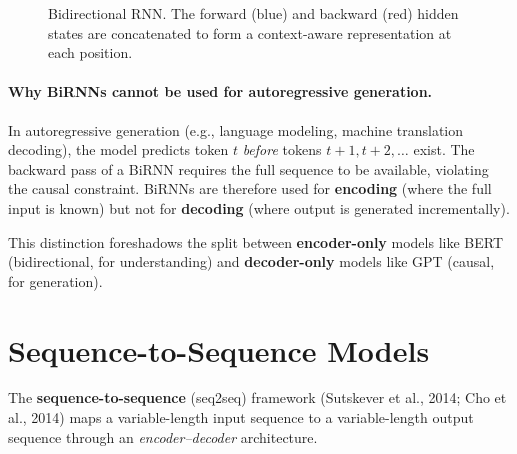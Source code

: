\begin{figure}[H]
\caption{Bidirectional RNN.  The forward (blue) and backward (red) hidden
states are concatenated to form a context-aware representation at each
position.}
\label{fig:birnn}
\end{figure}

\paragraph{Why BiRNNs cannot be used for autoregressive generation.}
In autoregressive generation (e.g., language modeling, machine translation
decoding), the model predicts token $t$ \emph{before} tokens $t+1, t+2,
\ldots$ exist.  The backward pass of a BiRNN requires the full sequence to
be available, violating the causal constraint.  BiRNNs are therefore used
for \textbf{encoding} (where the full input is known) but not for
\textbf{decoding} (where output is generated incrementally).

This distinction foreshadows the split between \textbf{encoder-only}
models like BERT (bidirectional, for understanding) and
\textbf{decoder-only} models like GPT (causal, for generation).


\section{Sequence-to-Sequence Models}
\label{sec:seq2seq}

The \textbf{sequence-to-sequence} (seq2seq) framework (Sutskever et al.,
2014; Cho et al., 2014) maps a variable-length input sequence to a
variable-length output sequence through an \emph{encoder--decoder}
architecture.

